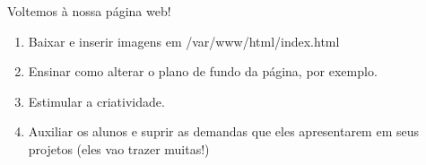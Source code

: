 {\LARGE Voltemos à nossa página web!}

\begin{enumerate}
	\item Baixar e inserir imagens em /var/www/html/index.html
	\item Ensinar como alterar o plano de fundo da página, por exemplo.
	\item Estimular a criatividade.
	\item Auxiliar os alunos e suprir as demandas que eles apresentarem em seus projetos (eles vao trazer muitas!)
\end{enumerate}
